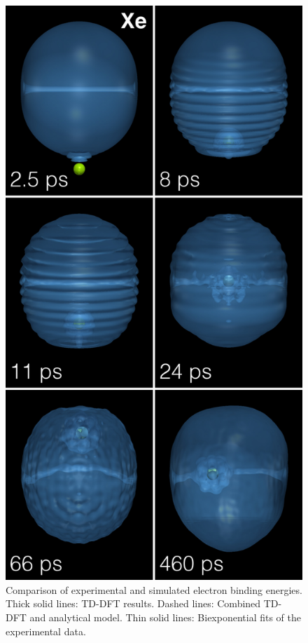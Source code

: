 \begin{figure}[!]
	\centering
	\includegraphics[width=1.0\linewidth,clip]{fig10} 
	\caption{Comparison of experimental and simulated electron binding energies. Thick solid lines: TD-DFT results. Dashed lines: Combined TD-DFT and analytical model. Thin solid lines: Biexponential fits of the experimental data.}
	\label{fig:comparePES}
\end{figure}
